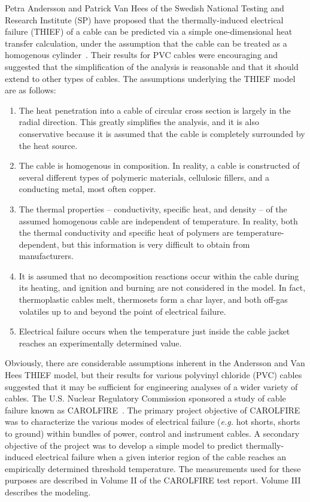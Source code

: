 \documentclass[11pt]{book}
\begin{document}
Petra Andersson and Patrick Van Hees of the Swedish National Testing and Research Institute
(SP) have proposed that the thermally-induced electrical failure (THIEF) of a cable can be predicted
via a simple one-dimensional heat transfer calculation, under the assumption that the cable can
be treated as a homogenous cylinder~\cite{Andersson:2005}. Their results for PVC
cables were encouraging and suggested that the simplification of the analysis is reasonable and
that it should extend to other types of cables. The assumptions underlying the THIEF model are as follows:
\begin{enumerate}
\item The heat penetration into a cable of circular cross section is largely in the radial direction.
This greatly simplifies the analysis, and it is also conservative because it is assumed that
the cable is completely surrounded by the heat source.
\item The cable is homogenous in composition. In reality, a cable is constructed of several
different types of polymeric materials, cellulosic fillers, and a conducting metal, most
often copper.
\item The thermal properties -- conductivity, specific heat, and density -- of the assumed
homogenous cable are independent of temperature. In reality, both the thermal
conductivity and specific heat of polymers are temperature-dependent, but this
information is very difficult to obtain from manufacturers.
\item It is assumed that no decomposition reactions occur within the cable during its heating,
and ignition and burning are not considered in the model. In fact, thermoplastic cables
melt, thermosets form a char layer, and both off-gas volatiles up to and beyond the point
of electrical failure.
\item Electrical failure occurs when the temperature just inside the cable jacket reaches an
experimentally determined value.
\end{enumerate}
Obviously, there are considerable assumptions inherent in the Andersson and Van Hees THIEF
model, but their results for various polyvinyl chloride (PVC) cables suggested that it may be
sufficient for engineering analyses of a wider variety of cables. The U.S. Nuclear Regulatory
Commission sponsored a study of cable failure known as CAROLFIRE~\cite{CAROLFIRE}. The primary project objective of CAROLFIRE was to
characterize the various modes of electrical
failure ({\em e.g.} hot shorts, shorts to ground) within bundles of power, control and instrument cables.
A secondary objective of the project was to develop a simple model to predict thermally-induced
electrical failure when a given interior region of the cable reaches an empirically
determined threshold temperature. The measurements used for these purposes are described in
Volume II of the CAROLFIRE test report. Volume III describes the modeling.
\end{document}
